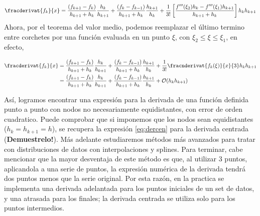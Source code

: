 \begin{equation}
  \fracderivat{f_{k}}{x} = \frac{(f_{k+1} - f_{k})}{h_{k+1} + h_{k}}\frac{h_{k}}{h_{k+1}} + \frac{(f_{k} - f_{k-1})}{h_{k+1} + h_{k}}\frac{h_{k+1}}{h_{k}} + \frac{1}{3!} \left[ \frac{ f^{\prime \prime \prime}(\xi_{2})h_{k} - f^{\prime \prime \prime}(\xi_{1})h_{k+1}}{h_{k+1} + h_{k}} \right]h_{k}h_{k+1}
\end{equation}
Ahora, por el teorema del valor medio, podemos reemplazar el último termino entre corchetes por una función evaluada en un punto $\xi$, con $\xi_{2} \leq \xi \leq \xi_{1}$, en efecto,

\begin{align}
  \fracderivat{f_{k}}{x} &= \frac{(f_{k+1} - f_{k})}{h_{k+1} + h_{k}}\frac{h_{k}}{h_{k+1}} + \frac{(f_{k} - f_{k-1})}{h_{k+1} + h_{k}}\frac{h_{k+1}}{h_{k}} + \frac{1}{3!} \fracnderivat{f_{k}(\xi)}{x}{3} h_{k}h_{k+1} \\
  &= \frac{(f_{k+1} - f_{k})}{h_{k+1} + h_{k}}\frac{h_{k}}{h_{k+1}} + \frac{(f_{k} - f_{k-1})}{h_{k+1} + h_{k}}\frac{h_{k+1}}{h_{k}} + \mathcal{O}(h_{k}h_{k+1})
\end{align}

Así, logramos encontrar una expresión para la derivada de una función definida punto a punto con nodos no necesariamente equidistantes, con error de orden cuadratico. Puede comprobar que si imponemos que los nodos sean equidistantes ($h_{k} = h_{k+1} = h$), se recupera la expresión \eqref{eq:dercen} para la derivada centrada (\textbf{Demuestrelo!}). Más adelante estudiaremos métodos más avanzados para tratar con distribuciones de datos con interpolaciones y splines. Para terminar, cabe mencionar que la mayor desventaja de este método es que, al utilizar 3 puntos, aplicandola a una serie de puntos, la expresión numérica de la derivada tendrá dos puntos menos que la serie original. Por esta razón, en la practica se implementa una derivada adelantada para los puntos iniciales de un set de datos, y una atrasada para los finales; la derivada centrada se utiliza solo para los puntos intermedios.


